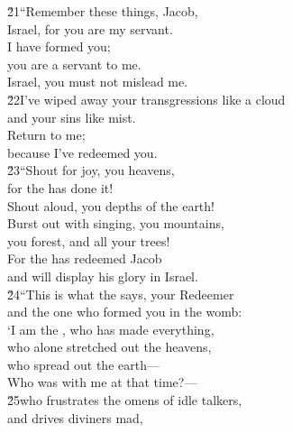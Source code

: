 \begin{poetry}
\poeml \v{21}``Remember these things, Jacob, \\
\poemll    Israel, for you are my servant. \\
\poeml I have formed you; \\
\poemll    you are a servant to me. \\
\poemlll       Israel, you must not mislead me. \\
\poeml \v{22}I've wiped away your transgressions like a cloud \\
\poemll    and your sins like mist. \\
\poeml Return to me; \\
\poemll    because I've redeemed you. \\
\poeml \v{23}``Shout for joy, you heavens, \\
\poemll    for the  has done it! \\
\poeml Shout aloud, you depths of the earth! \\
\poemll    Burst out with singing, you mountains, \\
\poemlll       you forest, and all your trees! \\
\poeml For the  has redeemed Jacob \\
\poemll    and will display his glory in Israel. \\
\poeml \v{24}``This is what the  says, your Redeemer \\
\poemll    and the one who formed you in the womb: \\
\poeml `I am the , who has made everything, \\
\poemll    who alone stretched out the heavens, \\
\poeml who spread out the earth--- \\
\poemll    Who was with me at that time?--- \\
\poeml \v{25}who frustrates the omens of idle talkers, \\
\poemll    and drives diviners mad, \\

\end{poetry}
